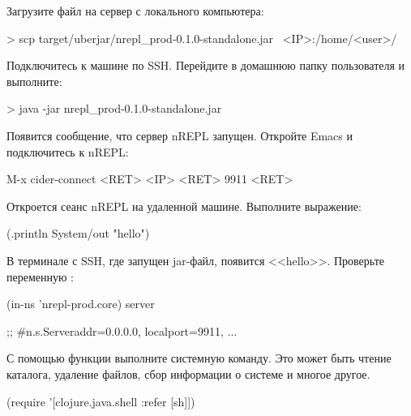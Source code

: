 Загрузите файл на сервер с локального компьютера:

\begin{english}
  \begin{bash}
> scp target/uberjar/nrepl_prod-0.1.0-standalone.jar \
      <IP>:/home/<user>/
  \end{bash}
\end{english}

Подключитесь к машине по SSH. Перейдите в домашнюю папку пользователя и выполните:

\begin{english}
  \begin{bash}
> java -jar nrepl_prod-0.1.0-standalone.jar
  \end{bash}
\end{english}

Появится сообщение, что сервер nREPL запущен. Откройте Emacs и подключитесь к nREPL:

\begin{english}
  \begin{text}
M-x cider-connect <RET> <IP> <RET> 9911 <RET>
  \end{text}
\end{english}

Откроется сеанс nREPL на удаленной машине. Выполните выражение:

\begin{english}
  \begin{clojure}
(.println System/out "hello")
  \end{clojure}
\end{english}

В терминале с SSH, где запущен jar-файл, появится <<hello>>. Проверьте переменную :

\begin{english}
  \begin{clojure}
(in-ns 'nrepl-prod.core)
server

;; #n.s.Server{addr=0.0.0.0, localport=9911, ...}
  \end{clojure}
\end{english}


С помощью функции  выполните системную команду. Это может быть чтение каталога, удаление файлов, сбор информации о системе и многое другое.

\begin{english}
  \begin{clojure}
(require '[clojure.java.shell :refer [sh]])
  \end{clojure}
\end{english}

